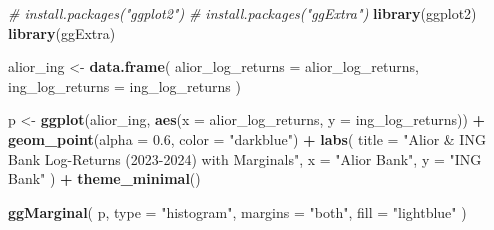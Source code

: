 \documentclass[
]{article}
\newenvironment{Shaded}{\begin{snugshade}}{\end{snugshade}}
\newcommand{\AttributeTok}[1]{\textcolor[rgb]{0.13,0.29,0.53}{#1}}
\newcommand{\CommentTok}[1]{\textcolor[rgb]{0.56,0.35,0.01}{\textit{#1}}}
\newcommand{\DecValTok}[1]{\textcolor[rgb]{0.00,0.00,0.81}{#1}}
\newcommand{\FloatTok}[1]{\textcolor[rgb]{0.00,0.00,0.81}{#1}}
\newcommand{\FunctionTok}[1]{\textcolor[rgb]{0.13,0.29,0.53}{\textbf{#1}}}
\newcommand{\NormalTok}[1]{#1}
\newcommand{\OtherTok}[1]{\textcolor[rgb]{0.56,0.35,0.01}{#1}}
\newcommand{\SpecialCharTok}[1]{\textcolor[rgb]{0.81,0.36,0.00}{\textbf{#1}}}
\newcommand{\StringTok}[1]{\textcolor[rgb]{0.31,0.60,0.02}{#1}}
\begin{document}
\begin{Shaded}
\end{Shaded}

\begin{Shaded}
\begin{Highlighting}[]
\CommentTok{\# install.packages("ggplot2")}
\CommentTok{\# install.packages("ggExtra")}
\FunctionTok{library}\NormalTok{(ggplot2)}
\FunctionTok{library}\NormalTok{(ggExtra)}
\end{Highlighting}
\end{Shaded}

\begin{Shaded}
\begin{Highlighting}[]
\NormalTok{alior\_ing }\OtherTok{\textless{}{-}} \FunctionTok{data.frame}\NormalTok{(}
  \AttributeTok{alior\_log\_returns =}\NormalTok{ alior\_log\_returns,}
  \AttributeTok{ing\_log\_returns   =}\NormalTok{ ing\_log\_returns}
\NormalTok{)}

\NormalTok{p }\OtherTok{\textless{}{-}} \FunctionTok{ggplot}\NormalTok{(alior\_ing, }\FunctionTok{aes}\NormalTok{(}\AttributeTok{x =}\NormalTok{ alior\_log\_returns, }\AttributeTok{y =}\NormalTok{ ing\_log\_returns)) }\SpecialCharTok{+}
  \FunctionTok{geom\_point}\NormalTok{(}\AttributeTok{alpha =} \FloatTok{0.6}\NormalTok{, }\AttributeTok{color =} \StringTok{"darkblue"}\NormalTok{) }\SpecialCharTok{+}
  \FunctionTok{labs}\NormalTok{(}
    \AttributeTok{title =} \StringTok{"Alior \& ING Bank Log{-}Returns (2023{-}2024) with Marginals"}\NormalTok{,}
    \AttributeTok{x =} \StringTok{"Alior Bank"}\NormalTok{,}
    \AttributeTok{y =} \StringTok{"ING Bank"}
\NormalTok{  ) }\SpecialCharTok{+}
  \FunctionTok{theme\_minimal}\NormalTok{()}

\FunctionTok{ggMarginal}\NormalTok{(}
\NormalTok{  p,}
  \AttributeTok{type =} \StringTok{"histogram"}\NormalTok{,}
  \AttributeTok{margins =} \StringTok{"both"}\NormalTok{,}
  \AttributeTok{fill =} \StringTok{"lightblue"}
\NormalTok{)}
\end{Highlighting}
\end{Shaded}
\end{document}
